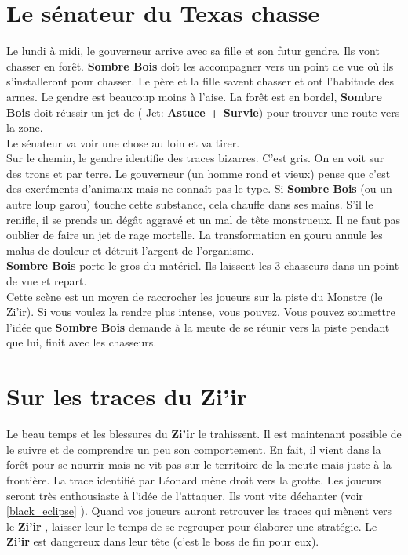 \documentclass[oneside,12pt]{book}
\newcommand\roll[1]{
( Jet: \textbf{#1})
}
\newcommand{\Leonard}{\textbf{Sombre Bois} }
\newcommand{\Thomas}{\textbf{Zi'ir} }
\begin{document}
\begin{flushleft}
\section{Le sénateur du Texas chasse}
Le lundi à midi, le gouverneur arrive avec sa fille et son futur gendre. Ils vont chasser en forêt. \Leonard doit les accompagner vers un point de vue où ils s'installeront pour chasser. Le père et la fille savent chasser et ont l'habitude des armes. Le gendre est beaucoup moins à l'aise. 
La forêt est en bordel, \Leonard doit réussir un jet de \roll{Astuce + Survie} pour trouver une route vers la zone. \\
Le sénateur va voir une chose au loin et va tirer. \\
Sur le chemin, le gendre identifie des traces bizarres. C'est gris. On en voit sur des trons et par terre. Le gouverneur (un homme rond et vieux) pense que c'est des excréments d'animaux mais ne connaît pas le type. Si \Leonard (ou un autre loup garou) touche cette substance, cela chauffe dans ses mains. S'il le renifle, il se prends un dégât aggravé et un mal de tête monstrueux. Il ne faut pas oublier de faire un jet de rage mortelle. La transformation en gouru annule les malus de douleur et détruit l'argent de l'organisme.\\
\Leonard porte le gros du matériel. Ils laissent les 3 chasseurs dans un point de vue et repart.\\
Cette scène est un moyen de raccrocher les joueurs sur la piste du Monstre (le Zi'ir). Si vous voulez la rendre plus intense, vous pouvez. Vous pouvez soumettre l'idée que \Leonard demande à la meute de se réunir vers la piste pendant que lui, finit avec les chasseurs. 


\section{Sur les traces du \Thomas}
Le beau temps et les blessures du \Thomas le trahissent. Il est maintenant possible de le suivre et de comprendre un peu son comportement. En fait, il vient dans la forêt pour se nourrir mais ne vit pas sur le territoire de la meute mais juste à la frontière. La trace identifié par Léonard mène droit vers la grotte. Les joueurs seront très enthousiaste à l'idée de l'attaquer.
Ils vont vite déchanter (voir \ref{black_eclipse} ). 
Quand vos joueurs auront retrouver les traces qui mènent vers le \Thomas, laisser leur le temps de se regrouper pour élaborer une stratégie. Le \Thomas est dangereux dans leur tête (c'est le boss de fin pour eux). 




\end{flushleft}
\end{document}
